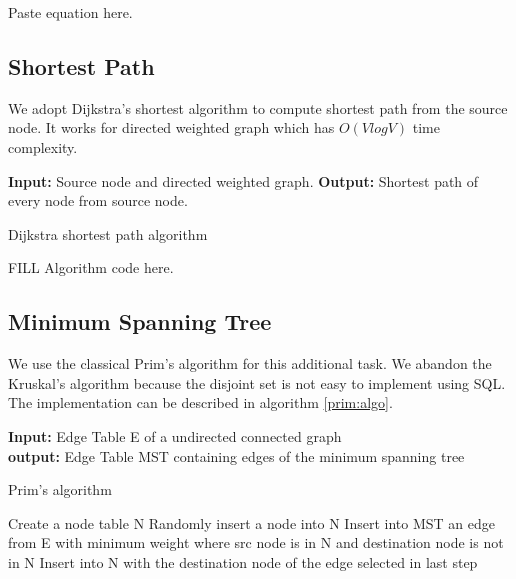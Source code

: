 Paste equation here. 

\subsection{Shortest Path}
We adopt Dijkstra's shortest algorithm to compute shortest path from the source node. It works for directed weighted
graph which has $O(V log V)$ time complexity. 

\begin{algorithm}
{\bf Input:} Source node and directed weighted graph. 
{\bf Output:} Shortest path of every node from source node. 
\begin{algorithmic}
\caption{Dijkstra shortest path algorithm}
\STATE  FILL Algorithm code here.
\end{algorithmic}
\end{algorithm}

\subsection{Minimum Spanning Tree}
We use the classical Prim's algorithm for this additional task. We abandon the Kruskal's algorithm because the disjoint set is not easy to implement using SQL. The implementation can be described in algorithm \ref{prim:algo}.

\begin{algorithm}
{\bf Input:} Edge Table E of a undirected connected graph \\
{\bf output:} Edge Table MST containing edges of the minimum spanning tree
\begin{algorithmic}
\caption{Prim's algorithm}
\STATE Create a node table N
\STATE Randomly insert a node into N
	\STATE Insert into MST an edge from E with minimum weight where src node is in N and destination node is not in N
	\STATE Insert into N with the destination node of the edge selected in last step
\ENDFOR
\end{algorithmic}
\label{prim:algo}
\end{algorithm}




